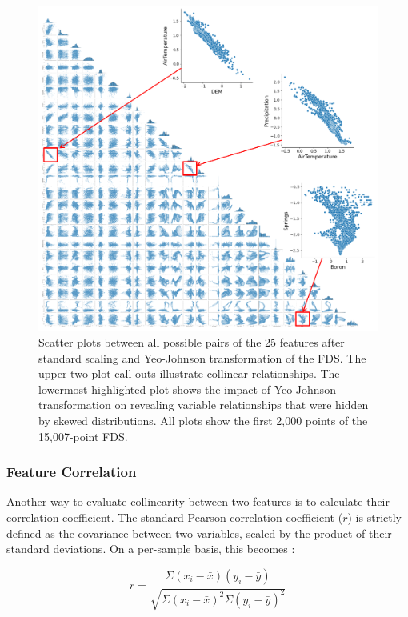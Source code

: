 \begin{figure}[!htp]
\centering
\includegraphics[width=\textwidth]{templates/images/Figure-Scatterplot_Scaled_Features.png}
\caption[Scaled FDS scatter plots]{Scatter plots between all possible pairs of the 25 features after standard scaling and Yeo-Johnson transformation of the FDS. The upper two plot call-outs illustrate collinear relationships. The lowermost highlighted plot shows the impact of Yeo-Johnson transformation on revealing variable relationships that were hidden by skewed distributions. All plots show the first 2,000 points of the 15,007-point FDS.}
\label{fig:scaled_scatter}
\end{figure}

\subsubsection{Feature Correlation}\label{ch3:feat_corr}
Another way to evaluate collinearity between two features is to calculate their correlation coefficient. The standard Pearson correlation coefficient ($r$) is strictly defined as the covariance between two variables, scaled by the product of their standard deviations. On a per-sample basis, this becomes \citep[~p. 70]{james_introduction_2013}:

\begin{equation}
    r = \frac{\Sigma(x_i-\bar{x})(y_i-\bar{y})}{\sqrt{\Sigma{(x_i-\bar{x})^2} \Sigma{(y_i-\bar{y})^2}}}
\end{equation}

